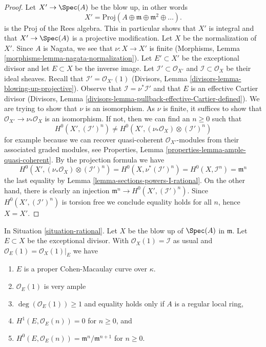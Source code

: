 \begin{proof}
Let $X' \to \Spec(A)$ be the blow up, in other words
$$
X' = \text{Proj}(A \oplus \mathfrak m \oplus \mathfrak m^2 \oplus \ldots).
$$
is the Proj of the Rees algebra. This in particular shows that
$X'$ is integral and that $X' \to \Spec(A)$ is a projective
modification. Let $X$ be the normalization of $X'$.
Since $A$ is Nagata, we see that $\nu : X \to X'$ is finite
(Morphisms, Lemma \ref{morphisms-lemma-nagata-normalization}).
Let $E' \subset X'$ be the exceptional divisor and let $E \subset X$
be the inverse image. Let $\mathcal{I}' \subset \mathcal{O}_{X'}$
and $\mathcal{I} \subset \mathcal{O}_X$ be their ideal sheaves.
Recall that $\mathcal{I}' = \mathcal{O}_{X'}(1)$
(Divisors, Lemma \ref{divisors-lemma-blowing-up-projective}).
Observe that $\mathcal{I} = \nu^*\mathcal{I}'$ and that $E$ is an
effective Cartier divisor (Divisors, Lemma
\ref{divisors-lemma-pullback-effective-Cartier-defined}).
We are trying to show that $\nu$ is an isomorphism. As $\nu$ is finite,
it suffices to show that $\mathcal{O}_{X'} \to \nu_*\mathcal{O}_X$
is an isomorphism. If not, then we can find an $n \geq 0$ such that
$$
H^0(X', (\mathcal{I}')^n) \not =
H^0(X', (\nu_*\mathcal{O}_X) \otimes (\mathcal{I}')^n)
$$
for example because we can recover quasi-coherent $\mathcal{O}_{X'}$-modules
from their associated graded modules, see
Properties, Lemma \ref{properties-lemma-ample-quasi-coherent}.
By the projection formula we have
$$
H^0(X', (\nu_*\mathcal{O}_X) \otimes (\mathcal{I}')^n) =
H^0(X, \nu^*(\mathcal{I}')^n) =
H^0(X, \mathcal{I}^n) = \mathfrak m^n
$$
the last equality by Lemma \ref{lemma-sections-powers-I-rational}.
On the other hand, there is clearly an injection
$\mathfrak m^n \to H^0(X', (\mathcal{I}')^n)$. Since
$H^0(X', (\mathcal{I}')^n)$ is torsion free we conclude equality holds
for all $n$, hence $X = X'$.
\end{proof}

\begin{lemma}
\label{lemma-cohomology-blow-up-rational}
In Situation \ref{situation-rational}.
Let $X$ be the blow up of $\Spec(A)$ in $\mathfrak m$. Let $E \subset X$
be the exceptional divisor. With $\mathcal{O}_X(1) = \mathcal{I}$ as
usual and $\mathcal{O}_E(1) = \mathcal{O}_X(1)|_E$ we have
\begin{enumerate}
\item $E$ is a proper Cohen-Macaulay curve over $\kappa$.
\item $\mathcal{O}_E(1)$ is very ample
\item $\deg(\mathcal{O}_E(1)) \geq 1$ and equality holds only if
$A$ is a regular local ring,
\item $H^1(E, \mathcal{O}_E(n)) = 0$ for $n \geq 0$, and
\item $H^0(E, \mathcal{O}_E(n)) = \mathfrak m^n/\mathfrak m^{n + 1}$
for $n \geq 0$.
\end{enumerate}
\end{lemma}

